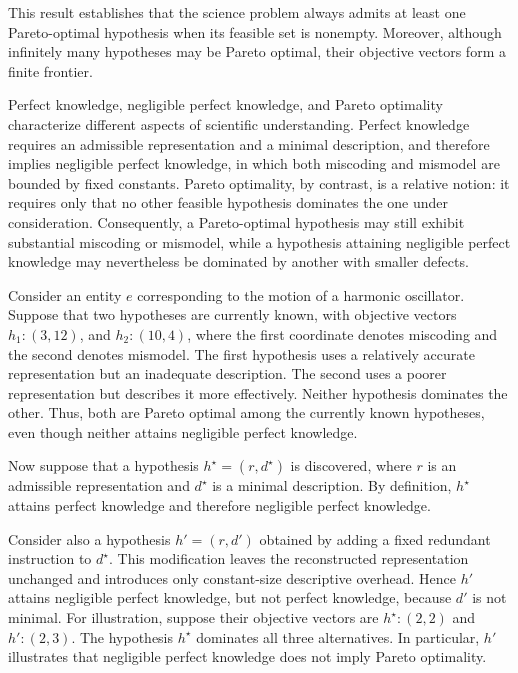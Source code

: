 This result establishes that the science problem always admits at least one Pareto-optimal hypothesis when its
feasible set is nonempty. Moreover, although infinitely many hypotheses may be Pareto optimal, their objective
vectors form a finite frontier.

Perfect knowledge, negligible perfect knowledge, and Pareto optimality characterize different aspects of scientific understanding. Perfect knowledge requires an admissible representation and a minimal description, and therefore implies negligible perfect knowledge, in which both miscoding and mismodel are bounded by fixed constants. Pareto optimality, by contrast, is a relative notion: it requires only that no other feasible hypothesis dominates the one under consideration. Consequently, a Pareto-optimal hypothesis may still exhibit substantial miscoding or mismodel, while a hypothesis attaining negligible perfect knowledge may nevertheless be dominated by another with smaller defects.

\begin{example}
Consider an entity $e$ corresponding to the motion of a harmonic oscillator. Suppose that two hypotheses are
currently known, with objective vectors $h_1:(3,12)$, and $h_2:(10,4)$, where the first coordinate denotes miscoding and the second denotes mismodel. The first hypothesis uses a relatively accurate representation but an inadequate description. The second uses a poorer representation but describes it more effectively. Neither hypothesis dominates the other. Thus, both are Pareto optimal among the currently known hypotheses, even though neither attains negligible perfect knowledge.

Now suppose that a hypothesis $h^\star=(r,d^\star)$ is discovered, where $r$ is an admissible representation and $d^\star$ is a minimal description. By definition, $h^\star$ attains perfect knowledge and therefore negligible perfect knowledge.

Consider also a hypothesis $h'=(r,d')$ obtained by adding a fixed redundant instruction to $d^\star$. This modification leaves the reconstructed representation unchanged and introduces only constant-size descriptive overhead. Hence $h'$ attains negligible perfect knowledge, but not perfect knowledge, because $d'$ is not minimal. For illustration, suppose their objective vectors are $h^\star:(2,2)$ and $h':(2,3)$. The hypothesis $h^\star$ dominates all three alternatives. In particular, $h'$ illustrates that negligible perfect knowledge does not imply Pareto optimality.
\end{example}

